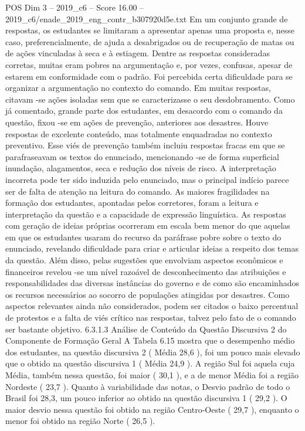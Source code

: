 \begin{textsample}{POS Dim 3 – 2019\_c6 – Score 16.00 – 2019\_c6/enade\_2019\_eng\_contr\_b307920d5e.txt}
Em um conjunto grande de respostas, os estudantes se limitaram a apresentar apenas uma proposta e, nesse caso, preferencialmente, de ajuda a desabrigados ou de recuperação de matas ou de ações vinculadas à seca e à estiagem.
Dentre as respostas consideradas corretas, muitas eram pobres na argumentação e, por vezes, confusas, apesar de estarem em conformidade com o padrão.
Foi percebida certa dificuldade para se organizar a argumentação no contexto do comando.
Em muitas respostas, citavam -se ações isoladas sem que se caracterizasse o seu desdobramento.
Como já comentado, grande parte dos estudantes, em desacordo com o comando da questão, fixou -se em ações de prevenção, anteriores aos desastres.
Houve respostas de excelente conteúdo, mas totalmente enquadradas no contexto preventivo.
Esse viés de prevenção também incluiu respostas fracas em que se parafraseavam os textos do enunciado, mencionando -se de forma superficial inundação, alagamentos, seca e redução dos níveis de risco.
A interpretação incorreta pode ter sido induzida pelo enunciado, mas o principal indício parece ser de falta de atenção na leitura do comando.
As maiores fragilidades na formação dos estudantes, apontadas pelos corretores, foram a leitura e interpretação da questão e a capacidade de expressão linguística.
As respostas com geração de ideias próprias ocorreram em escala bem menor do que aquelas em que os estudantes usaram do recurso da paráfrase pobre sobre o texto do enunciado, revelando dificuldade para criar e articular ideias a respeito dos temas da questão.
Além disso, pelas sugestões que envolviam aspectos econômicos e financeiros revelou -se um nível razoável de desconhecimento das atribuições e responsabilidades das diversas instâncias do governo e de como são encaminhados os recursos necessários ao socorro de populações atingidas por desastres.
Como aspectos relevantes ainda não considerados, podem ser citados o baixo percentual de protestos e a falta de viés crítico nas respostas, talvez pelo fato de o comando ser bastante objetivo. 6.3.1.3 Análise de Conteúdo da Questão Discursiva 2 do Componente de Formação Geral A Tabela 6.15 mostra que o desempenho médio dos estudantes, na questão discursiva 2 ( Média 28,6 ), foi um pouco mais elevado que o obtido na questão discursiva 1 ( Média 24,9 ).
A região Sul foi aquela cuja Média, também nessa questão, foi maior ( 30,1 ), e a de menor Média foi a região Nordeste ( 23,7 ).
Quanto à variabilidade das notas, o Desvio padrão de todo o Brasil foi 28,3, um pouco inferior ao obtido na questão discursiva 1 ( 29,2 ).
O maior desvio nessa questão foi obtido na região Centro-Oeste ( 29,7 ), enquanto o menor foi obtido na região Norte ( 26,5 ).

\end{textsample}
